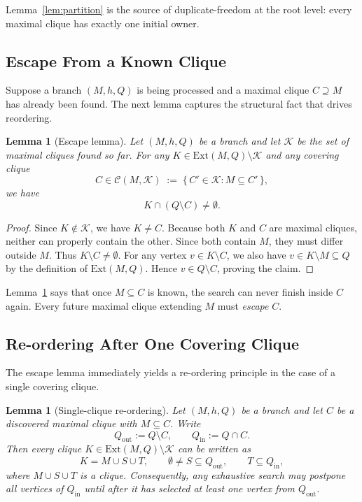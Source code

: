 \documentclass[sigconf, nonacm]{acmart}
\newtheorem{lemma}[theorem]{Lemma}
\theoremstyle{definition}
\theoremstyle{remark}
\begin{document}
Lemma~\ref{lem:partition} is the source of duplicate-freedom at the root level:
every maximal clique has exactly one initial owner.

\subsection{Escape From a Known Clique}

Suppose a branch $(M,h,Q)$ is being processed and a maximal clique
$C \supseteq M$ has already been found.  The next lemma captures the structural
fact that drives reordering.

\begin{lemma}[Escape lemma]\label{lem:sibling}
Let $(M,h,Q)$ be a branch and let $\mathcal{K}$ be the set of maximal cliques
found so far.  For any
$K \in \mathrm{Ext}(M,Q) \setminus \mathcal{K}$ and any covering clique
\[
  C \in \mathcal{C}(M,\mathcal{K})
  \;:=\;
  \{\, C' \in \mathcal{K} : M \subseteq C' \,\},
\]
we have
\[
  K \cap (Q \setminus C) \ne \emptyset.
\]
\end{lemma}

\begin{proof}
Since $K \notin \mathcal{K}$, we have $K \ne C$.  Because both $K$ and $C$ are
maximal cliques, neither can properly contain the other.  Since both contain
$M$, they must differ outside $M$.  Thus $K \setminus C \ne \emptyset$.
For any vertex $v \in K \setminus C$, we also have
$v \in K \setminus M \subseteq Q$ by the definition of $\mathrm{Ext}(M,Q)$.
Hence $v \in Q \setminus C$, proving the claim.
\end{proof}

Lemma~\ref{lem:sibling} says that once $M \subseteq C$ is known, the search can
never finish inside $C$ again.  Every future maximal clique extending $M$ must
\emph{escape} $C$.

\subsection{Re-ordering After One Covering Clique}

The escape lemma immediately yields a re-ordering principle in the case of a
single covering clique.

\begin{lemma}[Single-clique re-ordering]\label{lem:reorder}
Let $(M,h,Q)$ be a branch and let $C$ be a discovered maximal clique with
$M \subseteq C$.  Write
\[
  Q_{\mathrm{out}} := Q \setminus C,
  \qquad
  Q_{\mathrm{in}} := Q \cap C.
\]
Then every clique
$K \in \mathrm{Ext}(M,Q) \setminus \mathcal{K}$ can be written as
\[
  K = M \cup S \cup T,
  \qquad
  \emptyset \ne S \subseteq Q_{\mathrm{out}},
  \qquad
  T \subseteq Q_{\mathrm{in}},
\]
where $M \cup S \cup T$ is a clique.  Consequently, any exhaustive search may
postpone all vertices of $Q_{\mathrm{in}}$ until after it has selected at least
one vertex from $Q_{\mathrm{out}}$.
\end{lemma}
\end{document}

